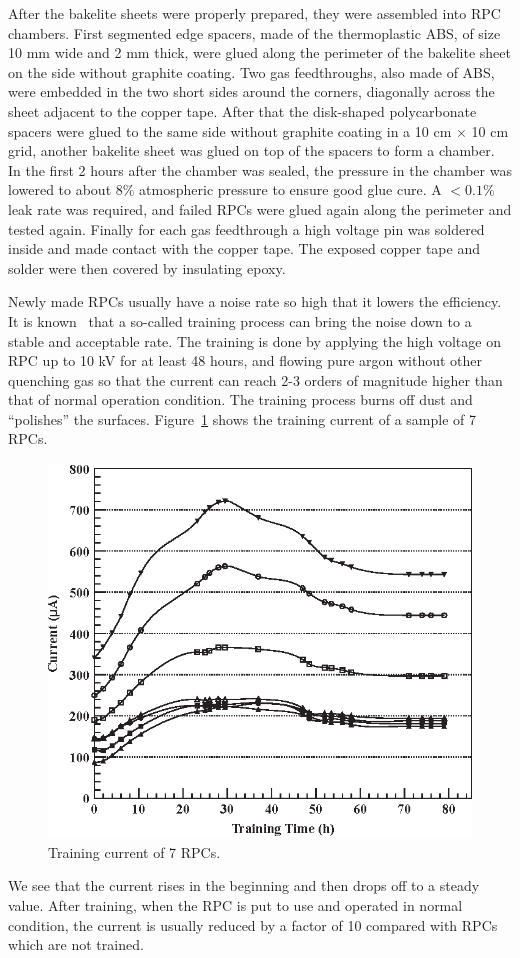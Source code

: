 After the bakelite sheets were properly prepared, they were assembled into RPC chambers. First segmented edge spacers, made of the thermoplastic ABS, of size 10 mm wide and 2 mm thick, were glued along the perimeter of the bakelite sheet on the side without graphite coating. Two gas feedthroughs, also made of ABS, were embedded in the two short sides around the corners, diagonally across the sheet adjacent to the copper tape. After that the disk-shaped polycarbonate spacers were glued to the same side without graphite coating in a 10 cm $\times$ 10 cm grid, another bakelite sheet was glued on top of the spacers to form a chamber. In the first 2 hours after the chamber was sealed, the pressure in the chamber was lowered to about $8\%$ atmospheric pressure to ensure good glue cure. A $<0.1\%$ leak rate was required, and failed RPCs were glued again along the perimeter and tested again. Finally for each gas feedthrough a high voltage pin was soldered inside and made contact with the copper tape. The exposed copper tape and solder were then covered by insulating epoxy.

Newly made RPCs usually have a noise rate so high that it lowers the efficiency. It is known~\cite{ZhangJiawen2007} that a so-called training process can bring the noise down to a stable and acceptable rate. The training is done by applying the high voltage on RPC up to 10 kV for at least 48 hours, and flowing pure argon without other quenching gas so that the current can reach 2-3 orders of magnitude higher than that of normal operation condition. The training process burns off dust and ``polishes'' the surfaces. Figure~\ref{fig:training_current} shows the training current of a sample of 7 RPCs.
\begin{figure}[ht]
	\centering
	\includegraphics[width=.7\textwidth]{figures/chap5/training_current.eps}
	\caption{Training current of 7 RPCs.}
	\label{fig:training_current}
\end{figure}
We see that the current rises in the beginning and then drops off to a steady value. After training, when the RPC is put to use and operated in normal condition, the current is usually reduced by a factor of 10 compared with RPCs which are not trained.


